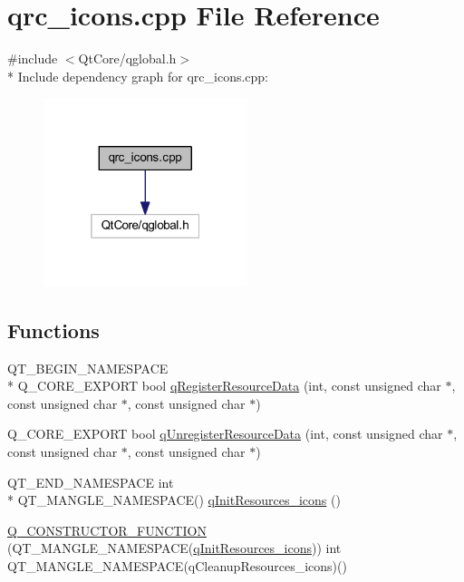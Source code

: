 \hypertarget{a00040}{\section{qrc\+\_\+icons.\+cpp File Reference}
\label{a00040}
}
{\ttfamily \#include $<$Qt\+Core/qglobal.\+h$>$}\\*
Include dependency graph for qrc\+\_\+icons.\+cpp\+:
\nopagebreak
\begin{figure}[H]
\begin{center}
\leavevmode
\includegraphics[width=169pt]{dc/d57/a00194}
\end{center}
\end{figure}
\subsection*{Functions}
\begin{DoxyCompactItemize}
\item 
Q\+T\+\_\+\+B\+E\+G\+I\+N\+\_\+\+N\+A\+M\+E\+S\+P\+A\+C\+E \\*
Q\+\_\+\+C\+O\+R\+E\+\_\+\+E\+X\+P\+O\+R\+T bool \hyperlink{a00040_ab3bec3d1e679084be46edc41e4c91bc1}{q\+Register\+Resource\+Data} (int, const unsigned char $\ast$, const unsigned char $\ast$, const unsigned char $\ast$)
\item 
Q\+\_\+\+C\+O\+R\+E\+\_\+\+E\+X\+P\+O\+R\+T bool \hyperlink{a00040_ad65f8bca8010dd1fd135a28a085c6d03}{q\+Unregister\+Resource\+Data} (int, const unsigned char $\ast$, const unsigned char $\ast$, const unsigned char $\ast$)
\item 
Q\+T\+\_\+\+E\+N\+D\+\_\+\+N\+A\+M\+E\+S\+P\+A\+C\+E int \\*
Q\+T\+\_\+\+M\+A\+N\+G\+L\+E\+\_\+\+N\+A\+M\+E\+S\+P\+A\+C\+E() \hyperlink{a00040_a604a4b2c01a3fcc04d212c2aabb2171a}{q\+Init\+Resources\+\_\+icons} ()
\item 
\hyperlink{a00040_aaf557971ad1a2e498a0a798edc7cb092}{Q\+\_\+\+C\+O\+N\+S\+T\+R\+U\+C\+T\+O\+R\+\_\+\+F\+U\+N\+C\+T\+I\+O\+N} (Q\+T\+\_\+\+M\+A\+N\+G\+L\+E\+\_\+\+N\+A\+M\+E\+S\+P\+A\+C\+E(\hyperlink{a00040_a604a4b2c01a3fcc04d212c2aabb2171a}{q\+Init\+Resources\+\_\+icons})) int Q\+T\+\_\+\+M\+A\+N\+G\+L\+E\+\_\+\+N\+A\+M\+E\+S\+P\+A\+C\+E(q\+Cleanup\+Resources\+\_\+icons)()
\end{DoxyCompactItemize}


